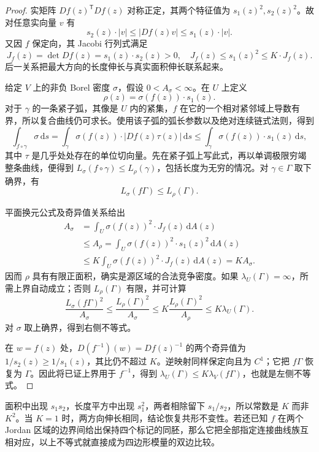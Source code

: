 \begin{proof}
实矩阵 \(Df(z)^{\mathsf T}Df(z)\) 对称正定，其两个特征值为 \(s_1(z)^2,s_2(z)^2\)。故对任意实向量 \(v\) 有
\[
 s_2(z)\cdot|v|\le|Df(z)v|\le s_1(z)\cdot|v|.
\]
又因 \(f\) 保定向，其 Jacobi 行列式满足
\[
 J_f(z)=\det Df(z)=s_1(z)\cdot s_2(z)>0,\quad
 J_f(z)\le s_1(z)^2\le K\cdot J_f(z).
\]
后一关系把最大方向的长度伸长与真实面积伸长联系起来。

给定 \(V\) 上的非负 Borel 密度 \(\sigma\)，假设 \(0<A_\sigma<\infty\)。在 \(U\) 上定义
\[
 \rho(z)=\sigma(f(z))\cdot s_1(z).
\]
对于 \(\gamma\) 的一条紧子弧，其像是 \(U\) 内的紧集，\(f\) 在它的一个相对紧邻域上导数有界，所以复合曲线仍可求长。使用该子弧的弧长参数以及绝对连续链式法则，得到
\[
 \int_{f\circ\gamma}\sigma\,\mathrm ds
 =\int_\gamma\sigma(f(z))\cdot|Df(z)\tau(z)|\,\mathrm ds
 \le\int_\gamma\sigma(f(z))\cdot s_1(z)\,\mathrm ds,
\]
其中 \(\tau\) 是几乎处处存在的单位切向量。先在紧子弧上写此式，再以单调极限穷竭整条曲线，便得到 \(L_\sigma(f\circ\gamma)\le L_\rho(\gamma)\)，包括长度为无穷的情况。对 \(\gamma\in\Gamma\) 取下确界，有
\[
 L_\sigma(f\Gamma)\le L_\rho(\Gamma).
\]

平面换元公式及奇异值关系给出
\[
 \begin{aligned}
 A_\sigma
 &=\int_U\sigma(f(z))^2\cdot J_f(z)\,\mathrm dA(z)\\
 &\le A_\rho
 =\int_U\sigma(f(z))^2\cdot s_1(z)^2\,\mathrm dA(z)\\
 &\le K\int_U\sigma(f(z))^2\cdot J_f(z)\,\mathrm dA(z)
 =K A_\sigma.
 \end{aligned}
\]
因而 \(\rho\) 具有有限正面积，确实是源区域的合法竞争密度。如果 \(\lambda_U(\Gamma)=\infty\)，所需上界自动成立；否则 \(L_\rho(\Gamma)\) 有限，并可计算
\[
 \frac{L_\sigma(f\Gamma)^2}{A_\sigma}
 \le\frac{L_\rho(\Gamma)^2}{A_\sigma}
 \le K\frac{L_\rho(\Gamma)^2}{A_\rho}
 \le K\lambda_U(\Gamma).
\]
对 \(\sigma\) 取上确界，得到右侧不等式。

在 \(w=f(z)\) 处，\(D(f^{-1})(w)=Df(z)^{-1}\) 的两个奇异值为 \(1/s_2(z)\ge1/s_1(z)\)，其比仍不超过 \(K\)。逆映射同样保定向且为 \(C^1\)；它把 \(f\Gamma\) 恢复为 \(\Gamma\)。因此将已证上界用于 \(f^{-1}\)，得到 \(\lambda_U(\Gamma)\le K\lambda_V(f\Gamma)\)，也就是左侧不等式。
\end{proof}

面积中出现 \(s_1s_2\)，长度平方中出现 \(s_1^2\)，两者相除留下 \(s_1/s_2\)，所以常数是 \(K\) 而非 \(K^2\)。当 \(K=1\) 时，两方向伸长相同，结论恢复共形不变性。若还已知 \(f\) 在两个 Jordan 区域的边界间给出保持四个标记的同胚，那么它把全部指定连接曲线族互相对应，以上不等式就直接成为四边形模量的双边比较。

